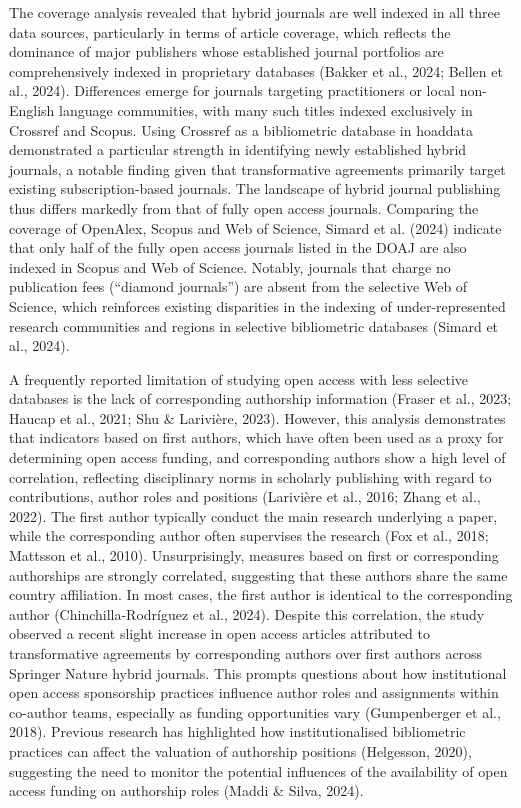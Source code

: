 \documentclass[a4paper,man,floatsintext,longtable,noextraspace,10pt]{apa6}
\begin{document}
The coverage analysis revealed that hybrid journals are well indexed in
all three data sources, particularly in terms of article coverage, which
reflects the dominance of major publishers whose established journal
portfolios are comprehensively indexed in proprietary databases (Bakker
et al., 2024; Bellen et al., 2024). Differences emerge for journals
targeting practitioners or local non-English language communities, with
many such titles indexed exclusively in Crossref and Scopus. Using
Crossref as a bibliometric database in hoaddata demonstrated a
particular strength in identifying newly established hybrid journals, a
notable finding given that transformative agreements primarily target
existing subscription-based journals. The landscape of hybrid journal
publishing thus differs markedly from that of fully open access
journals. Comparing the coverage of OpenAlex, Scopus and Web of Science,
Simard et al. (2024) indicate that only half of the fully open access
journals listed in the DOAJ are also indexed in Scopus and Web of
Science. Notably, journals that charge no publication fees (``diamond
journals'') are absent from the selective Web of Science, which
reinforces existing disparities in the indexing of under-represented
research communities and regions in selective bibliometric databases
(Simard et al., 2024).

A frequently reported limitation of studying open access with less
selective databases is the lack of corresponding authorship information
(Fraser et al., 2023; Haucap et al., 2021; Shu \& Larivière, 2023).
However, this analysis demonstrates that indicators based on first
authors, which have often been used as a proxy for determining open
access funding, and corresponding authors show a high level of
correlation, reflecting disciplinary norms in scholarly publishing with
regard to contributions, author roles and positions (Larivière et al.,
2016; Zhang et al., 2022). The first author typically conduct the main
research underlying a paper, while the corresponding author often
supervises the research (Fox et al., 2018; Mattsson et al., 2010).
Unsurprisingly, measures based on first or corresponding authorships are
strongly correlated, suggesting that these authors share the same
country affiliation. In most cases, the first author is identical to the
corresponding author (Chinchilla-Rodríguez et al., 2024). Despite this
correlation, the study observed a recent slight increase in open access
articles attributed to transformative agreements by corresponding
authors over first authors across Springer Nature hybrid journals. This
prompts questions about how institutional open access sponsorship
practices influence author roles and assignments within co-author teams,
especially as funding opportunities vary (Gumpenberger et al., 2018).
Previous research has highlighted how institutionalised bibliometric
practices can affect the valuation of authorship positions (Helgesson,
2020), suggesting the need to monitor the potential influences of the
availability of open access funding on authorship roles (Maddi \& Silva,
2024).
\end{document}
